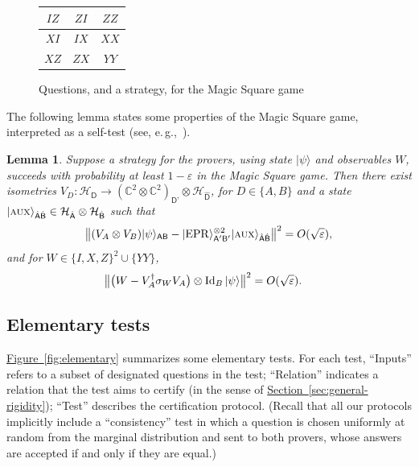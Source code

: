 \documentclass[11pt]{article}
\numberwithin{equation}{section}
\newtheorem{lemma}[theorem]{Lemma}
\theoremstyle{definition}
\theoremstyle{plain}
\newcommand{\C}{\mathbb C}
\newcommand{\eg}{e.\,g.}
\newcommand{\expref}[2]{\hyperref[#2]{#1~\ref{#2}}}
\newcommand{\ket}[1]{|#1\rangle}
\newcommand{\Id}{\ensuremath{\mathop{\rm Id}\nolimits}}
\newcommand{\reg}[1]{{\textsf{#1}}}
\newcommand{\mH}{\mathcal{H}}
\newcommand{\eps}{\varepsilon}
\newcommand{\EPR}{{\rm EPR}}
\newcommand{\aux}{\textsc {aux}}
\begin{document}
\begin{figure}[H]
\begin{center}
\begin{tabular}{|c|c|c|}
\hline
$IZ$ & $ZI$ & $ZZ$ \\
\hline
$XI$ & $IX$ & $XX$ \\
\hline
$XZ$ & $ZX$ & $YY$\\
\hline
\end{tabular}
\end{center}
\caption{Questions, and a strategy, for the Magic Square game}
\label{fig:ms}
\end{figure}

The following lemma states some properties of the Magic Square game, interpreted as a self-test (see, %
 \eg,~\cite{WBMS16}). 

\begin{lemma}\label{lem:ms-rigid}
Suppose a strategy for the provers, using state $\ket{\psi}$ and observables $W$, succeeds with probability at least $1-\eps$ in the Magic Square game. Then there exist  isometries $V_D:\mH_\reg{D} \to (\C^2\otimes \C^2)_{\reg{D'}}\otimes {\mH}_{\hat{\reg{D}}}$, for $D\in\{A,B\}$ and a state $\ket{\aux}_{\hat{\reg{A}}\hat{\reg{B}}} \in {\mH}_{\hat{\reg{A}}}\otimes {\mH}_{\hat{\reg{B}}}$ such that
$$\big\| (V_A \otimes V_B) \ket{\psi}_{\reg{AB}} - \ket{\EPR}_{\reg{A}'\reg{B}'}^{\otimes 2} \ket{\aux}_{\hat{\reg{A}}\hat{\reg{B}}} \big\|^2 = O(\sqrt{\eps}),$$
and for $W\in \{I,X,Z\}^2 \cup \{YY\}$,
\begin{align*}
\big\| \big(W -V_A^\dagger \sigma_W V_A\big) \otimes \Id_B \ket{\psi} \big\|^2 &= O(\sqrt{\eps}).
\end{align*}
\end{lemma}





\subsection{Elementary tests}
\label{sec:elementary}



\expref{Figure}{fig:elementary} summarizes some elementary tests. For each test, ``Inputs'' refers to a subset of designated questions in the test; ``Relation'' indicates a relation that the test aims to certify (in the sense of \expref{Section}{sec:general-rigidity}); ``Test'' describes the certification protocol. (Recall that all our protocols implicitly include a ``consistency'' test in which a question is chosen uniformly at random from the marginal distribution and sent to both provers, whose answers are accepted if and only if they are equal.)
\end{document}
